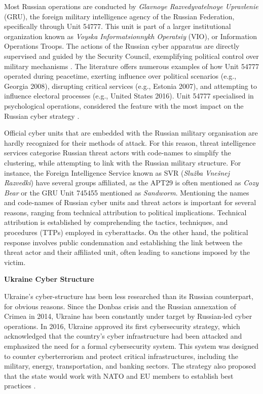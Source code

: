 Most Russian operations are conducted by \textit{Glavnoye Razvedyvatelnoye Upravlenie} (GRU), the foreign military intelligence agency of the Russian Federation, specifically through Unit 54777. This unit is part of a larger institutional organization known as \textit{Voyska Informatsionnykh Operatsiy} (VIO), or Information Operations Troops. The actions of the Russian cyber apparatus are directly supervised and guided by the Security Council, exemplifying political control over military mechanisms \autocite{wilde_2022_cyber}. The literature offers numerous examples of how Unit 54777 operated during peacetime, exerting influence over political scenarios (e.g., Georgia 2008), disrupting critical services (e.g., Estonia 2007), and attempting to influence electoral processes (e.g., United States 2016). Unit 54777 specialised in psychological operations, considered the feature with the most impact on the Russian cyber strategy \autocite{wilde_2022_cyber}.

Official cyber units that are embedded with the Russian military organisation are hardly recognized for their methods of attack. For this reason, threat intelligence services categorise Russian threat actors with code-names to simplify the clustering, while attempting to link with the Russian military structure. For instance, the Foreign Intelligence Service known as SVR (\textit{Služba Vnešnej Razvedki}) have several groups affiliated, as the APT29 is often mentioned as \textit{Cozy Bear} or the GRU Unit 745455 mentioned as \textit{Sandworm}. Mentioning the names and code-names of Russian cyber units and threat actors is important for several reasons, ranging from technical attribution to political implications. Technical attribution is established by comprehending the tactics, techniques, and procedures (TTPs) employed in cyberattacks. On the other hand, the political response involves public condemnation and establishing the link between the threat actor and their affiliated unit, often leading to sanctions imposed by the victim.

\textbf{Ukraine Cyber Structure}

Ukraine's cyber-structure has been less researched than its Russian counterpart, for obvious reasons. Since the Donbas crisis and the Russian annexation of Crimea in 2014, Ukraine has been constantly under target by Russian-led cyber operations. In 2016, Ukraine approved its first cybersecurity strategy, which acknowledged that the country's cyber infrastructure had been attacked and emphasized the need for a formal cybersecurity system. This system was designed to counter cyberterrorism and protect critical infrastructures, including the military, energy, transportation, and banking sectors. The strategy also proposed that the state would work with NATO and EU members to establish best practices \autocite{brantly_2019_cybersecurity}.

